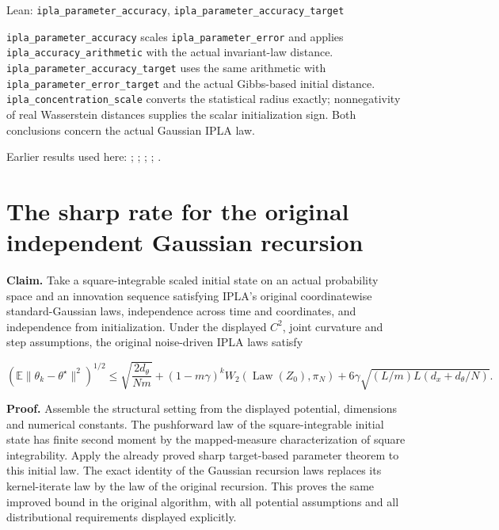 \documentclass[11pt,a4paper]{article}
\newlength{\leancharwidth}
\newenvironment{leancode}{\par\smallskip\begingroup\ttfamily\footnotesize\raggedright
  \settowidth{\leancharwidth}{M}\setlength{\parskip}{0pt}\setlength{\parindent}{0pt}
  \frenchspacing}{\par\endgroup\smallskip}
\newcommand{\leanlabel}[1]{\par\smallskip\noindent{\small\bfseries #1}\par}
\begin{document}
\begin{leanbox}{Lean: \texttt{ipla\_\allowbreak{}parameter\_\allowbreak{}accuracy}, \texttt{ipla\_\allowbreak{}parameter\_\allowbreak{}accuracy\_\allowbreak{}target}}
\begin{leancode}
\end{leancode}
\leanlabel{How the Lean proof follows the argument}
\texttt{ipla\_\allowbreak{}parameter\_\allowbreak{}accuracy} scales \texttt{ipla\_\allowbreak{}parameter\_\allowbreak{}error} and applies \texttt{ipla\_\allowbreak{}accuracy\_\allowbreak{}arithmetic} with the actual invariant-law distance. \texttt{ipla\_\allowbreak{}parameter\_\allowbreak{}accuracy\_\allowbreak{}target} uses the same arithmetic with \texttt{ipla\_\allowbreak{}parameter\_\allowbreak{}error\_\allowbreak{}target} and the actual Gibbs-based initial distance. \texttt{ipla\_\allowbreak{}concentration\_\allowbreak{}scale} converts the statistical radius exactly; nonnegativity of real Wasserstein distances supplies the scalar initialization sign. Both conclusions concern the actual Gaussian IPLA law.
\end{leanbox}


Earlier results used here: \cite[Section~3.17.4]{LangevinLean2026ULASC}; \cite[Section~3.1.1]{LangevinLean2026IPLA}; \cite[Section~3.1.6]{LangevinLean2026IPLA}; \cite[Section~3.3.1]{LangevinLean2026IPLA}; \cite[Section~3.3.2]{LangevinLean2026IPLA}.

\section{\texorpdfstring{The sharp rate for the original independent Gaussian recursion}{The sharp rate for the original independent Gaussian recursion}}


\textbf{Claim.} Take a square-integrable scaled initial state on an actual probability space and an innovation sequence satisfying IPLA's original coordinatewise standard-Gaussian laws, independence across time and coordinates, and independence from initialization. Under the displayed \(C^2\), joint curvature and step assumptions, the original noise-driven IPLA laws satisfy

\[\left(\mathbb E\|\theta_k-\theta^\star\|^2\right)^{1/2}\le\sqrt{\frac{2d_\theta}{Nm}}+(1-m\gamma)^kW_2(\operatorname{Law}(Z_0),\pi_N)+6\gamma\sqrt{(L/m)L(d_x+d_\theta/N)}.\]


\textbf{Proof.} Assemble the structural setting from the displayed potential, dimensions and numerical constants. The pushforward law of the square-integrable initial state has finite second moment by the mapped-measure characterization of square integrability. Apply the already proved sharp target-based parameter theorem to this initial law. The exact identity of the Gaussian recursion laws replaces its kernel-iterate law by the law of the original recursion. This proves the same improved bound in the original algorithm, with all potential assumptions and all distributional requirements displayed explicitly.
\end{document}
